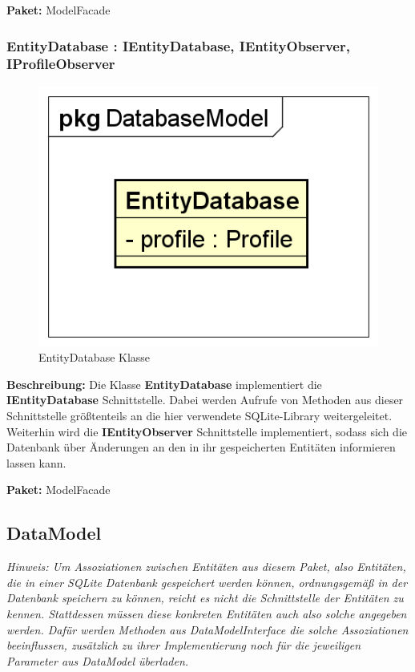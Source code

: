 \documentclass[a4paper]{scrreprt}
\begin{document}
\textbf{Paket:} ModelFacade

\subsubsection{EntityDatabase : IEntityDatabase, IEntityObserver, IProfileObserver}
\begin{figure}[H]
\centering
\includegraphics[width=0.45\textheight]{graphics/Klassendiagramme/Model/EntityDatabase.png}
\caption{EntityDatabase Klasse}
\end{figure}
\textbf{Beschreibung:} Die Klasse \textbf{EntityDatabase} implementiert die \textbf{IEntityDatabase} Schnittstelle. Dabei werden Aufrufe von Methoden aus dieser Schnittstelle größtenteils an die hier verwendete SQLite-Library weitergeleitet.\\
Weiterhin wird die \textbf{IEntityObserver} Schnittstelle implementiert, sodass sich die Datenbank über Änderungen an den in ihr gespeicherten Entitäten informieren lassen kann.

\textbf{Paket:} ModelFacade

\subsection{DataModel}
\textit{Hinweis: Um Assoziationen zwischen Entitäten aus diesem Paket, also Entitäten, die in einer SQLite Datenbank gespeichert werden können, ordnungsgemäß in der Datenbank speichern zu können, reicht es nicht die Schnittstelle der Entitäten zu kennen. Stattdessen müssen diese konkreten Entitäten auch also solche angegeben werden. Dafür werden Methoden aus DataModelInterface die solche Assoziationen beeinflussen, zusätzlich zu ihrer Implementierung noch für die jeweiligen Parameter aus DataModel überladen.}
\end{document}
